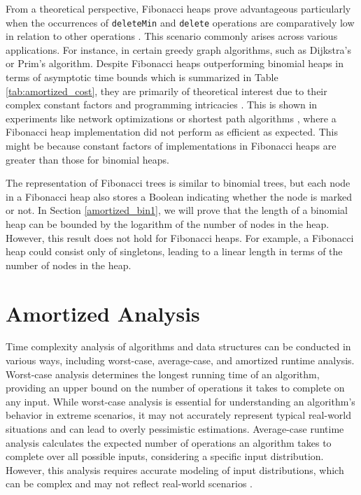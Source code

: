 \documentclass{clmthesis}
\begin{document}
From a theoretical perspective, Fibonacci heaps prove advantageous particularly when the occurrences of \texttt{deleteMin} and \texttt{delete} operations are comparatively low in relation to other operations \cite{thomas2022}. This scenario commonly arises across various applications. For instance, in certain greedy graph algorithms, such as Dijkstra's or Prim's algorithm.
Despite Fibonacci heaps outperforming binomial heaps in terms of asymptotic time bounds which is summarized in Table \ref{tab:amortized_cost}, they are primarily of theoretical interest due to their complex constant factors and programming intricacies \cite{thomas2022}. This is shown in experiments like network optimizations \cite{fredman1986pairing} or shortest path algorithms \cite{cherkassky1996shortest}, where a Fibonacci heap implementation did not perform as efficient as expected. This might be because constant factors of implementations in Fibonacci heaps are greater than those for binomial heaps. 


The representation of Fibonacci trees is similar to binomial trees, but each node in a Fibonacci heap also stores a Boolean indicating whether the node is marked or not.
In Section \ref{amortized_bin1}, we will prove that the length of a binomial heap can be bounded by the logarithm of the number of nodes in the heap. However, this result does not hold for Fibonacci heaps. For example, a Fibonacci heap could consist only of singletons, leading to a linear length in terms of the number of nodes in the heap.



\chapter{Amortized Analysis}\label{sec:amortized}
Time complexity analysis of algorithms and data structures can be conducted in various ways, including worst-case, average-case, and amortized runtime analysis.
Worst-case analysis determines the longest running time of an algorithm, providing an upper bound on the number of operations it takes to complete on any input. While worst-case analysis is essential for understanding an algorithm's behavior in extreme scenarios, it may not accurately represent typical real-world situations and can lead to overly pessimistic estimations.
Average-case runtime analysis calculates the expected number of operations an algorithm takes to complete over all possible inputs, considering a specific input distribution. However, this analysis requires accurate modeling of input distributions, which can be complex and may not reflect real-world scenarios \cite{tarjan1985amortized}.
\end{document}
